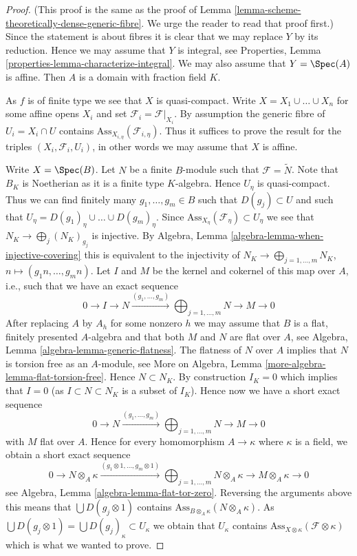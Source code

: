 \begin{proof}
(This proof is the same as the proof of
Lemma \ref{lemma-scheme-theoretically-dense-generic-fibre}.
We urge the reader to read that proof first.)
Since the statement is about fibres it is clear that we may replace
$Y$ by its reduction. Hence we may assume that $Y$ is integral, see
Properties, Lemma \ref{properties-lemma-characterize-integral}.
We may also assume that $Y = \Spec(A)$ is affine. Then $A$
is a domain with fraction field $K$.

\medskip\noindent
As $f$ is of finite type we see that $X$ is quasi-compact.
Write $X = X_1 \cup \ldots \cup X_n$ for some affine opens $X_i$
and set $\mathcal{F}_i = \mathcal{F}|_{X_i}$. By
assumption the generic fibre of $U_i = X_i \cap U$ contains
$\text{Ass}_{X_{i, \eta}}(\mathcal{F}_{i, \eta})$.
Thus it suffices to prove the result for the triples
$(X_i, \mathcal{F}_i, U_i)$,
in other words we may assume that $X$ is affine.

\medskip\noindent
Write $X = \Spec(B)$. Let $N$ be a finite $B$-module such that
$\mathcal{F} = \widetilde{N}$.
Note that $B_K$ is Noetherian as it is a
finite type $K$-algebra. Hence $U_\eta$ is quasi-compact. Thus we can
find finitely many $g_1, \ldots, g_m \in B$ such that $D(g_j) \subset U$
and such that $U_\eta = D(g_1)_\eta \cup \ldots \cup D(g_m)_\eta$.
Since $\text{Ass}_{X_\eta}(\mathcal{F}_\eta) \subset U_\eta$
we see that $N_K \to \bigoplus_j (N_K)_{g_j}$ is injective. By
Algebra, Lemma \ref{algebra-lemma-when-injective-covering}
this is equivalent to the injectivity of
$N_K \to \bigoplus\nolimits_{j = 1, \ldots, m} N_K$,
$n \mapsto (g_1n, \ldots, g_mn)$. Let $I$ and $M$ be the kernel and
cokernel of this map over $A$, i.e., such that we have an exact sequence
$$
0 \to I \to N \xrightarrow{(g_1, \ldots, g_m)}
\bigoplus\nolimits_{j = 1, \ldots, m} N \to M \to 0
$$
After replacing $A$ by $A_h$ for some nonzero $h$ we may assume that
$B$ is a flat, finitely presented $A$-algebra and that
both $M$ and $N$ are flat over $A$, see
Algebra, Lemma \ref{algebra-lemma-generic-flatness}.
The flatness of $N$ over $A$ implies that $N$ is torsion free as an
$A$-module, see
More on Algebra, Lemma \ref{more-algebra-lemma-flat-torsion-free}.
Hence $N \subset N_K$. By construction $I_K = 0$ which implies that $I = 0$
(as $I \subset N \subset N_K$ is a subset of $I_K$). Hence now
we have a short exact sequence
$$
0 \to N \xrightarrow{(g_1, \ldots, g_m)}
\bigoplus\nolimits_{j = 1, \ldots, m} N \to M \to 0
$$
with $M$ flat over $A$. Hence for every homomorphism $A \to \kappa$ where
$\kappa$ is a field, we obtain a short exact sequence
$$
0 \to N \otimes_A \kappa \xrightarrow{(g_1 \otimes 1, \ldots, g_m \otimes 1)}
\bigoplus\nolimits_{j = 1, \ldots, m} N \otimes_A \kappa \to
M \otimes_A \kappa \to 0
$$
see
Algebra, Lemma \ref{algebra-lemma-flat-tor-zero}.
Reversing the arguments above
this means that $\bigcup D(g_j \otimes 1)$ contains
$\text{Ass}_{B \otimes_A \kappa}(N \otimes_A \kappa)$.
As $\bigcup D(g_j \otimes 1) = \bigcup D(g_j)_\kappa \subset U_\kappa$
we obtain that $U_\kappa$ contains
$\text{Ass}_{X \otimes \kappa}(\mathcal{F} \otimes \kappa)$
which is what we wanted to prove.
\end{proof}

